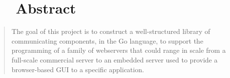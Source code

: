 \section*{\hfil \ \ \ Abstract \hfil}
\begin{quote}
The goal of this project is to construct a well-structured
library of communicating components, in the Go language, to support
the programming of a family of webservers that could range in scale 
from a full-scale commercial server to an embedded server used to provide 
a browser-based GUI to a specific application.
\end{quote}